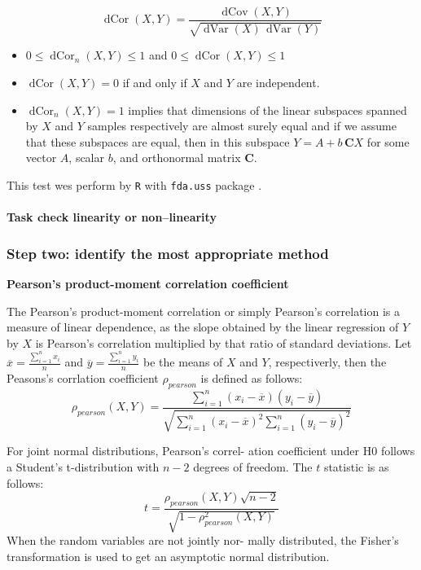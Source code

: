 \documentclass[a4paper]{article}
\begin{document}
\begin{equation}
\operatorname{dCor}(X,Y) = \frac{\operatorname{dCov}(X,Y)}{\sqrt{\operatorname{dVar}(X)\,\operatorname{dVar}(Y)}}
\end{equation}


\begin{itemize}
\item $0\leq\operatorname{dCor}_n(X,Y)\leq1$ and $0\leq\operatorname{dCor}(X,Y)\leq1$
\item $\operatorname{dCor}(X,Y) = 0$ if and only if $X$ and $Y$ are independent.
\item $\operatorname{dCor}_n(X,Y) = 1$ implies that dimensions of the linear subspaces spanned by $X$ and $Y$ samples respectively are almost surely equal and if we assume that these subspaces are equal, then in this subspace $Y = A + b\,\mathbf{C}X$ for some vector $A$, scalar $b$, and orthonormal matrix $\mathbf{C}$.
\end{itemize}

This test wes perform by \texttt{R} with \texttt{fda.uss} package \cite{fda.usc.package}. 

\paragraph{Task check linearity or non--linearity}



\subsubsection*{Step two: identify the most appropriate method} 
\textbf{Pearson’s product-moment correlation coefficient}

The Pearson’s product-moment correlation or simply Pearson’s correlation is a measure of linear dependence, as the slope obtained by the linear regression of $Y$ by $X$ is Pearson’s correlation multiplied by that ratio of standard deviations.
Let $\overline{x} = \frac{\sum_{i=1}^{n} x_{i}}{n}$ and $\overline{y} = \frac{\sum_{i=1}^{n} y_{i}}{n}$ be the means of $X$ and $Y$, respectiverly, then the Peasons's corrlation coefficient $\rho_{pearson}$ is defined as follows: 
\begin{equation}
\rho_{pearson}(X, Y) = \frac{\sum_{i=1}^{n}(x_{i} - \overline{x})(y_{i} - \overline{y})}
{\sqrt{\sum_{i=1}^{n}(x_{i} - \overline{x})^2  \sum_{i=1}^{n}(y_{i} - \overline{y})^2}}
\end{equation}


For joint normal distributions, Pearson’s correl- ation coefficient under H0 follows a Student’s t-distribution with $ n -2 $ degrees of freedom. The $t$ statistic is as follows:
\begin{equation}
t = \frac{\rho_{pearson}(X, Y) \sqrt{n -2}}{\sqrt{1- \rho^{2}_{pearson}(X, Y)}}
\end{equation}
When the random variables are not jointly nor- mally distributed, the Fisher’s transformation is used to get an asymptotic normal distribution.
\end{document}
